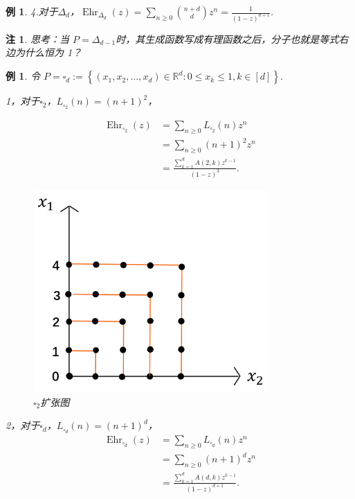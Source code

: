 \documentclass[12pt,a4paper]{ctexbook} %
\newcounter{theorem}[section]
\newtheorem{example}[theorem]{例}
\newtheorem{remark}[theorem]{注}
\numberwithin{figure}{section}
\theoremstyle{problemstyle}
\numberwithin{equation}{section} %
\begin{document}
\begin{example}
4.对于$\Delta_d$，$\operatorname{Ehr}_{\Delta_d}(z) = \sum_{n \geq 0} \binom{n+d}{d} z^n = \frac{1}{(1-z)^{d+1}}$.

\end{example}\label{Ehrhart1}

\begin{remark}
    思考：当 $ P = \Delta_{d-1}$时，其生成函数写成有理函数之后，分子也就是等式右边为什么恒为 1？
\end{remark}


\begin{example}
    令 $ P = \square_{d}:= \left\{(x_1, x_2, \ldots, x_d) \in \mathbb{R}^d : 0 \leq x_k \leq 1 , k \in [d] \right\}.$

1，对于$\square_2$，$L_{\square_2}(n) = (n+1)^2 $，

\begin{minipage}{0.5\textwidth}
    \begin{align*}
   \operatorname{Ehr}_{\square_2}(z) 
   &= \sum_{n \geq 0} L_{\square_2}(n) z^n \\
   &= \sum_{n \geq 0} (n+1)^2 z^n \\
   &= \frac{\sum_{k=1}^d A(2, k) z^{k-1}}{(1 - z)^{3}}.
    \end{align*}
\end{minipage}
\begin{minipage}{0.5\textwidth}
\begin{figure}[H] %
    \centering
    \includegraphics[width=0.8\textwidth]{image4.png} %
    \caption{$\square_2$扩张图} %
    \label{fig:my_image} %
\end{figure}
\end{minipage}


2，对于$\square_d$，$ L_{\square_d}(n) = (n+1)^d $，
\begin{align*}
   \operatorname{Ehr}_{\square_d}(z) &= \sum_{n \geq 0} L_{\square_d}(n) z^n \\
   &= \sum_{n \geq 0} (n+1)^d z^n \\
   &= \frac{\sum_{k=1}^d A(d, k) z^{k-1}}{(1 - z)^{d+1}}.
\end{align*}

\end{example}\label{Ehrhart2}
\end{document}
